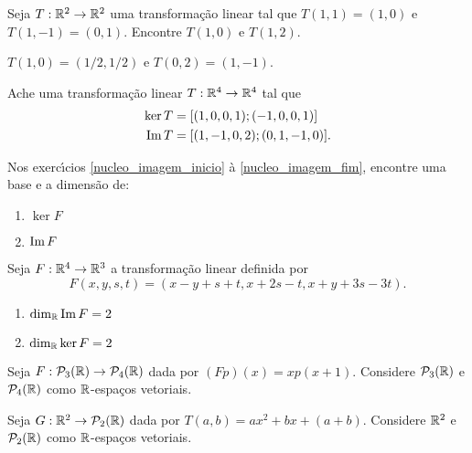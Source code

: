 \documentclass[12pt]{exam}
\begin{document}
\begin{exercicio}
  Seja $T : \mathbb{R}^2 \to \mathbb{R}^2$ uma transforma\c{c}\~ao linear tal que $T(1,1) = (1,0)$ e $T(1,-1) = (0,1)$. Encontre $T(1,0)$ e $T(1,2)$.
  \begin{solucao}
    $T(1,0) = (1/2,1/2)$ e $T(0,2) = (1,-1)$.
  \end{solucao}
\end{exercicio}

\begin{exercicio}
  Ache uma transforma\c{c}\~ao linear $T : \mathbb{R}^4 \to \mathbb{R}^4$ tal que
  \begin{align*}
    \ker T &= [(1,0,0,1);(-1,0,0,1)]\\
    {\rm Im\,} T &= [(1,-1,0,2);(0,1,-1,0)].
  \end{align*}
\end{exercicio}

Nos exerc{\'\i}cios \eqref{nucleo_imagem_inicio} \`a \eqref{nucleo_imagem_fim}, encontre uma base e a dimens\~ao de:
\begin{enumerate}[label=({\alph*})]
  \item $\ker F$
  \item ${\rm Im\,} F$
\end{enumerate}

\begin{exercicio}\label{nucleo_imagem_inicio}
  Seja $F : \mathbb{R}^4 \to \mathbb{R}^3$ a transforma\c{c}\~ao linear definida por
  \[
  F(x,y,s,t) = (x - y + s + t, x + 2s - t, x + y + 3s - 3t).
  \]
  \begin{solucao}
    \begin{enumerate}[label=({\alph*})]
      \item $\dim_{\mathbb{R}}{\rm Im\,} F = 2$
      \item $\dim_{\mathbb{R}}\ker F = 2$
    \end{enumerate}
  \end{solucao}
\end{exercicio}

\begin{exercicio}
  Seja $F : \mathcal{P}_3(\mathbb{R}) \to \mathcal{P}_4(\mathbb{R})$ dada por $(Fp)(x) = xp(x + 1)$. Considere $\mathcal{P}_3(\mathbb{R})$ e $\mathcal{P}_4(\mathbb{R})$ como $\mathbb{R}$-espa\c{c}os vetoriais.
\end{exercicio}

\begin{exercicio}
  Seja $G : \mathbb{R}^2 \to \mathcal{P}_2(\mathbb{R})$ dada por $T(a,b) = ax^2 + bx + (a + b)$. Considere $\mathbb{R}^2$ e $\mathcal{P}_2(\mathbb{R})$ como $\mathbb{R}$-espa\c{c}os vetoriais.
\end{exercicio}
\end{document}
